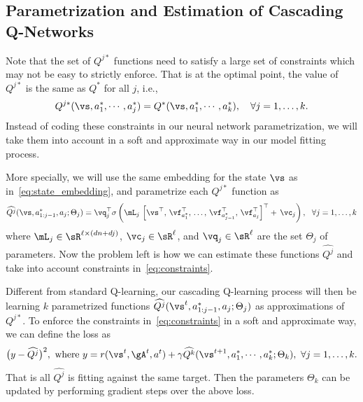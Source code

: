 \documentclass{article} %
\newcommand{\Li}[1]{{\color{cyan}{\bf\sf [Li: #1]}}}
\begin{document}
\vspace{-3mm}
\subsection{Parametrization and Estimation of Cascading Q-Networks}
\vspace{-3mm}

Note that the set of $Q^{j*}$ functions need to satisfy a large set of constraints which may not be easy to strictly enforce. That is at the optimal point, the value of $Q^{j*}$ is the same as $Q^*$ for all $j$, i.e.,
{\small \begin{equation}
    \label{eq:constraints}
        Q^{j*}(\vs, a_1^*, \cdots, a_j^*) = Q^*(\vs,a_1^*,\cdots,a_k^*),\quad \forall j=1,\ldots, k.
\end{equation}}
Instead of coding these constraints in our neural network parametrization, we will take them into account in a soft and approximate way in our model fitting process.

More specially, we will use the same embedding for the state $\vs$ as in~\eqref{eq:state_embedding}, and parametrize each $Q^{j*}$ function as
{\small \begin{equation}
    \widehat{Q^{j}}(\vs, a_{1:j-1}^*, a_j; \Theta_j) = \vq_j^\top \sigma \left( \mL_j\,
        \left[
            \vs^\top,\,
            \vf_{a_1^*}^\top,\,
            \ldots,\,
            \vf_{a_{j-1}^*}^\top,\,
            \vf_{a_j}^\top
        \right]^\top
        +\, \vc_j
    \right),~~\forall j=1,\ldots,k
\end{equation}}
where $\mL_j \in \sR^{\ell\times(dn+dj)}$, $\vc_j \in \sR^{\ell}$, and $\vq_j \in \sR^{\ell}$ are the set $\Theta_j$ of parameters. Now the problem left is how we can estimate these functions $\widehat{Q^{j}}$ and take into account constraints in~\eqref{eq:constraints}.

Different from standard Q-learning, our cascading Q-learning process will then be learning $k$ parametrized functions $\widehat{Q^j}(\vs^t, a_{1:j-1}^*, a_j; \Theta_j)$ as approximations of $Q^{j*}$. To enforce the constraints in~\eqref{eq:constraints} in a soft and approximate way, we can define the loss as
{\small \begin{equation}
\label{eq:loss}
\big(y- \widehat{Q^j} \big)^2,~\text{where}~y= r(\vs^t, \gA^t, a^t) + \gamma \widehat{Q^{k}}(\vs^{t+1}, a_1^*,\cdots,a_k^*; \Theta_k),~ \forall j=1,\ldots,k.
\end{equation}}
That is all $\widehat{Q^j}$ is fitting against the same target. Then the parameters $\Theta_k$ can be updated by performing gradient \Li{descent} steps over the above loss.
\end{document}
